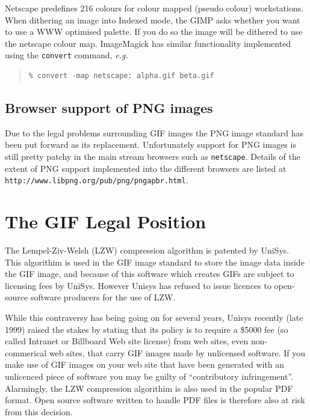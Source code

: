 \documentclass[twoside,11pt]{article}
\newcommand{\htmladdnormallink}[2]{#1}
\newcommand{\htmlref}[2]{#1}
\newcommand{\xlabel}[1]{}
\begin{document}
Netscape predefines 216 colours for colour mapped (\htmlref{pseudo colour}{sc15_pseudo}) workstations. When dithering an image into Indexed mode, the \htmlref{GIMP}{sc15_gimp} asks whether you want to use a WWW optimised palette. If you do so the  image will be dithered to use the netscape colour map. \htmlref{ImageMagick}{sc15_magick} has similar functionality implemented using the {\tt convert} command, {\em e.g.\ }

\small
\begin{quote}
\begin{verbatim}
% convert -map netscape: alpha.gif beta.gif
\end{verbatim}
\end{quote}
\normalsize

\subsection{\xlabel{sc15_browser+png}Browser support of PNG images\label{sc15_browser+png}}

Due to the \htmlref{legal problems}{sc15_giflegal} surrounding GIF images the PNG image standard has been put forward as its replacement. Unfortunately support for PNG images is still pretty patchy in the main stream browsers such as \htmladdnormallink{{\tt netscape}}{http://www.netscape.com}. Details of the extent of PNG support implemented into the different browsers are listed at \htmladdnormallink{{\tt http://www.libpng.org/pub/png/pngapbr.html}}{http://www.libpng.org/pub/png/pngapbr.html}.
    
\section{\xlabel{sc15_giflegal}The GIF Legal Position\label{sc15_giflegal}}

The Lempel-Ziv-Welsh (LZW) compression algorithm is \htmladdnormallink{patented}{http://www.patents.ibm.com/details?pn=US04558302__} by UniSys.  This algorithim is used in the GIF image standard to store the image data inside the GIF image, and because of this software which creates GIFs are subject to licensing fees by UniSys. However Unisys has refused to issue licences to open-source software producers for the use of LZW. 

While this contraversy has being going on for several years, Unisys \htmladdnormallink{recently}{http://www.unisys.com/unisys/lzw/lzw-license.asp} (late 1999) raised the stakes by stating that its policy is to require a \$5000 fee (so called Intranet or Billboard Web site license) from web sites, even non-commerical web sites, that carry GIF images made by unlicensed software. If you make use of GIF images on your web site that have been generated with an unlicenced piece of software you may be guilty of ``contributory infringement''. Alarmingly, the LZW compression algorithim is also used in the popular PDF format. Open source software written to handle PDF files is therefore also at risk from this decision.
\end{document}

